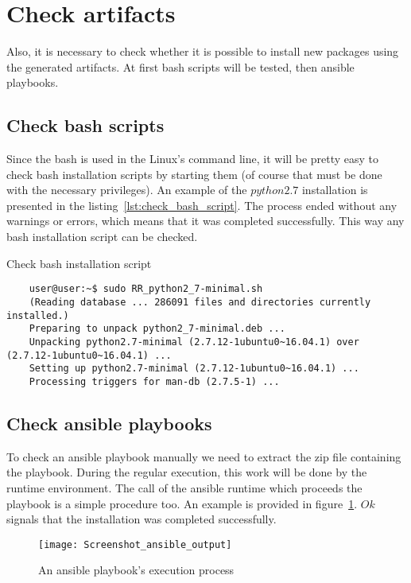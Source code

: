 \section{Check artifacts}\label{sec:checkart}
Also, it is necessary to check whether it is possible to install new packages using the generated artifacts.
At first bash scripts will be tested, then ansible playbooks.

\subsection*{Check bash scripts}
Since the bash is used in the Linux's command line, it will be pretty easy to check bash installation scripts by starting them (of course that must be done with the necessary privileges).
An example of the $python2.7$ installation is presented in the listing~\ref{lst:check_bash_script}. %
The process ended without any warnings or errors, which means that it was completed successfully.
This way any bash installation script can be checked.
\begin{Listing}
	\caption{Check bash installation script}
	\label{lst:check_bash_script}
	\begin{lstlisting}
	user@user:~$ sudo RR_python2_7-minimal.sh 
	(Reading database ... 286091 files and directories currently installed.)
	Preparing to unpack python2_7-minimal.deb ...
	Unpacking python2.7-minimal (2.7.12-1ubuntu0~16.04.1) over (2.7.12-1ubuntu0~16.04.1) ...
	Setting up python2.7-minimal (2.7.12-1ubuntu0~16.04.1) ...
	Processing triggers for man-db (2.7.5-1) ...
	\end{lstlisting}
\end{Listing}

\subsection*{Check ansible playbooks}
To check an ansible playbook manually we need to extract the zip file containing the playbook. 
During the regular execution, this work will be done by the runtime environment.
The call of the ansible runtime which proceeds the playbook is a simple procedure too.
An example is provided in figure~\ref{fig:ansible_output2}. %
$Ok$ signals that the installation was completed successfully.
\begin{figure}[ht]   
	\centering
	\texttt{[image: Screenshot\_ansible\_output]}
	\caption{An ansible playbook's execution process}
	\label{fig:ansible_output2}
\end{figure}